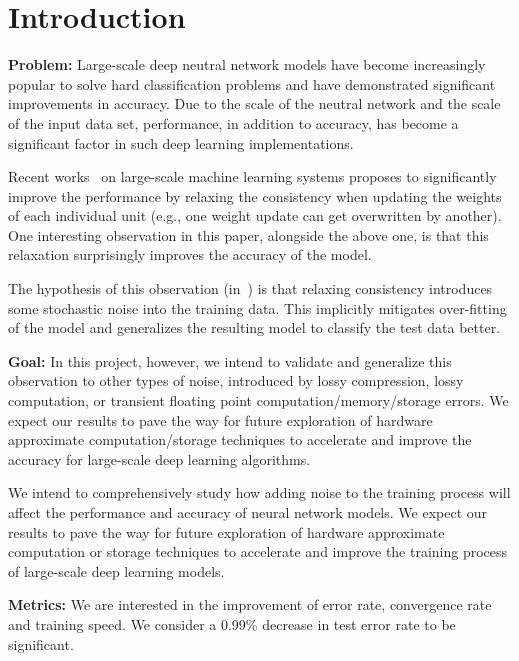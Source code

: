 \section{Introduction}
\label{sec:intro}


{\bf Problem:}
Large-scale deep neutral network models have become increasingly popular
to solve hard classification problems and have demonstrated significant
improvements in accuracy. Due to the scale of the neutral network and the
scale of the input data set, performance, in addition to accuracy, has
become a significant factor in such deep learning implementations.

Recent works~\cite{dean2012large, chilimbi14adam} on large-scale machine
learning systems proposes to significantly improve the performance by relaxing
the consistency when updating the weights of each individual unit (e.g., one
weight update can get overwritten by another). One interesting observation in
this paper, alongside the above one, is that this relaxation surprisingly
improves the accuracy of the model.

The hypothesis of this observation (in~\cite{chilimbi14adam}) is that relaxing
consistency introduces some stochastic noise into the training data. This
implicitly mitigates over-fitting of the model and generalizes the resulting
model to classify the test data better.

{\bf Goal:}
In this project, however, we intend to validate and generalize this observation
to other types of noise, introduced by lossy compression, lossy computation, or
transient floating point computation/memory/storage errors. We expect our
results to pave the way for future exploration of hardware approximate
computation/storage techniques to accelerate and improve the accuracy for
large-scale deep learning algorithms.

We intend to comprehensively study how adding noise to the training
process will affect the performance and accuracy of neural network models.
We expect our results to pave the way for future exploration of
hardware approximate computation or storage techniques to accelerate
and improve the training process of large-scale deep learning models.

{\bf Metrics:} %
We are interested in the improvement of error rate, convergence rate
and training speed.
We consider a 0.99\% decrease in test error rate to be significant.




